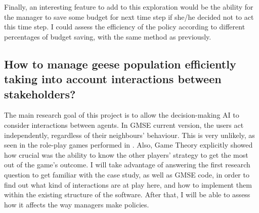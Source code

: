 \documentclass[12pt,a4paper]{article}
\begin{document}
Finally, an interesting feature to add to this exploration would be the ability for the manager to save some budget for next time step if she/he decided not to act this time step.
I could assess the efficiency of the policy according to different percentages of budget saving, with the same method as previously.

%
%

\subsection{How to manage geese population efficiently taking into account interactions between stakeholders?}

The main research goal of this project is to allow the decision-making AI to consider interactions between agents.
In GMSE current version, the users act independently, regardless of their neighbours' behaviour.
This is very unlikely, as seen in the role-play games performed in \cite{redpath2018games}.
Also, Game Theory explicitly showed how crucial was the ability to know the other players' strategy to get the most out of the game's outcome.
I will take advantage of answering the first research question to get familiar with the case study, as well as GMSE code, in order to find out what kind of interactions are at play here, and how to implement them within the existing structure of the software.
After that, I will be able to assess how it affects the way managers make policies.
\end{document}
